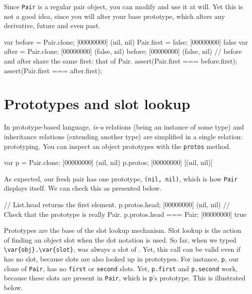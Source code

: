 Since \lstinline|Pair| is a regular pair object, you can modify and
use it at will. Yet this is not a good idea, since you will alter your
base prototype, which alters any derivative, future and even past.

\begin{urbiscript}[firstnumber=last]
var before = Pair.clone;
[00000000] (nil, nil)
Pair.first = false;
[00000000] false
var after = Pair.clone;
[00000000] (false, nil)
before;
[00000000] (false, nil)
// before and after share the same first: that of Pair.
assert(Pair.first === before.first);
assert(Pair.first === after.first);
\end{urbiscript}

\section{Prototypes and slot lookup}

In prototype-based language, \emph{is-a} relations (being an instance
of some type) and inheritance relations (extending another type) are
simplified in a single relation: prototyping. You can inspect an
object prototypes with the \lstinline{protos} method.

\begin{urbiscript}[firstnumber=1]
var p = Pair.clone;
[00000000] (nil, nil)
p.protos;
[00000000] [(nil, nil)]
\end{urbiscript}

As expected, our fresh pair has one prototype, \lstinline|(nil, nil)|,
which is how \lstinline|Pair| displays itself. We can check this as
presented below.

\begin{urbiscript}[firstnumber=last]
// List.head returns the first element.
p.protos.head;
[00000000] (nil, nil)
// Check that the prototype is really Pair.
p.protos.head === Pair;
[00000000] true
\end{urbiscript}

Prototypes are the base of the slot lookup mechanism. Slot lookup is
the action of finding an object slot when the dot notation is used.
So far, when we typed
\lstinline|\var{obj}.\var{slot}|,  was always a slot of
.  Yet, this call can be valid even if  has no
 slot, because slots are also looked up in prototypes. For
instance, \lstinline|p|, our clone of \lstinline|Pair|, has no
\lstinline|first| or \lstinline|second| slots. Yet,
\lstinline|p.first| and \lstinline|p.second| work, because these slots
are present in \lstinline|Pair|, which is \lstinline|p|'s
prototype. This is illustrated below.


